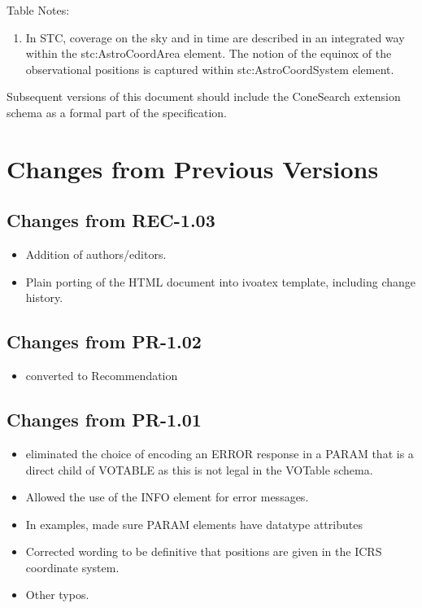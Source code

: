 \documentclass[11pt,a4paper]{ivoa}
\begin{document}
Table Notes:
\begin{enumerate}
	\item In STC, coverage on the sky and in time are described in an integrated way within the stc:AstroCoordArea element. The notion of the equinox of the observational positions is captured within stc:AstroCoordSystem element.
\end{enumerate}
Subsequent versions of this document should include the ConeSearch extension schema as a formal part of the specification.

\section{Changes from Previous Versions}
\label{appendix:c}

\subsection{Changes from REC-1.03}
\begin{itemize}
	\item Addition of authors/editors.
	\item Plain porting of the HTML document into ivoatex template, including change history.
\end{itemize}

\subsection{Changes from PR-1.02}
\begin{itemize}
	\item converted to Recommendation
\end{itemize}

\subsection{Changes from PR-1.01}
\begin{itemize}
	\item eliminated the choice of encoding an ERROR response in a PARAM that is a direct child of VOTABLE as this is not legal in the VOTable schema.
	\item Allowed the use of the INFO element for error messages.
	\item In examples, made sure PARAM elements have datatype attributes
	\item Corrected wording to be definitive that positions are given in the ICRS coordinate system.
	\item Other typos.
\end{itemize}
\end{document}
